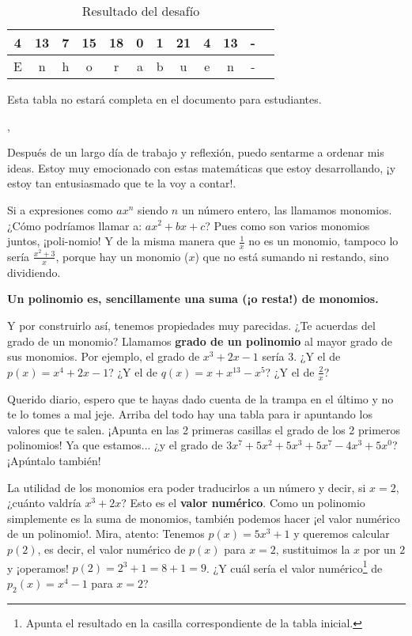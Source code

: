 \documentclass{article}
\DeclareRobustCommand{\augiefamily}{%
  \fontfamily{augie}\fontseries{m}\fontshape{n}\selectfont}
\begin{document}
\begin{table}
\centering
\caption{Resultado del desafío}
\begin{tabular}{|c|c|c|c|c|c|c|c|c|c|c|c|}
\hline
4 & 13 & 7 & 15 & 18 & 0 & 1 & 21 & 4 & 13 & -\\\hline
E & n  & h & o & r & a & b & u & e & n & -\\\hline
\end{tabular}

\small{Esta tabla no estará completa en el documento para estudiantes.}
\end{table}

\augiefamily{Querido diario},
\Fontauri

Después de un largo día de trabajo y reflexión, puedo sentarme a ordenar mis ideas.
%
Estoy muy emocionado con estas matemáticas que estoy desarrollando, ¡y estoy tan entusiasmado que te la voy a contar!.


Si a expresiones como $ax^n$ siendo $n$ un número entero, las llamamos monomios. ¿Cómo podríamos llamar a: $ax^2+bx+c$? 
%
Pues como son varios monomios juntos, ¡poli-nomio!
%
Y de la misma manera que $\frac{1}{x}$ no es un monomio, tampoco lo sería $\frac{x^2+3}{x}$, porque hay un monomio ($x$) que no está sumando ni restando, sino dividiendo.

\textbf{Un polinomio es, sencillamente una suma (¡o resta!) de monomios.}

Y por construirlo así, tenemos propiedades muy parecidas. ¿Te acuerdas del grado de un monomio?
%
Llamamos \textbf{grado de un polinomio} al mayor grado de sus monomios. Por ejemplo, el grado de $x^3+2x-1$ sería $3$.
%
¿Y el de $p(x) = x^4+2x-1$? ¿Y el de $q(x) = x+x^{13}-x^5$? ¿Y el de $\frac{2}{x}$?

Querido diario, espero que te hayas dado cuenta de la trampa en el último y no te lo tomes a mal jeje.
%
Arriba del todo hay una tabla para ir apuntando los valores que te salen. ¡Apunta en las 2 primeras casillas el grado de los 2 primeros polinomios!
%
Ya que estamos... ¿y el grado de $3x^7+5x^2+5x^3+5x^7-4x^3+5x^0$? ¡Apúntalo también!

La utilidad de los monomios era poder traducirlos a un número y decir, si $x=2$, ¿cuánto valdría $x^3+2x$? 
%
Esto es el \textbf{valor numérico}.
%
Como un polinomio simplemente es la suma de monomios, también podemos hacer ¡el valor numérico de un polinomio!. 
%
Mira, atento:
%
Tenemos $p(x) = 5x^3+1$ y queremos calcular $p(2)$, es decir, el valor numérico de $p(x)$ para $x=2$, sustituimos la $x$ por un $2$ y ¡operamos! $p(2) = 2^3+1=8+1=9$.
%
¿Y cuál sería el valor numérico\footnote{Apunta el resultado en la casilla correspondiente de la tabla inicial.} de $p_2(x) = x^4-1$ para $x=2$? 
\end{document}
